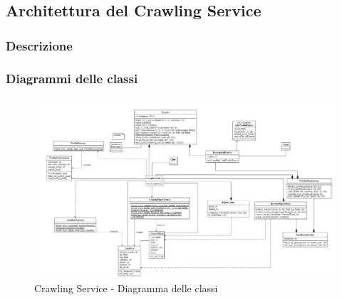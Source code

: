 \subsection{Architettura del Crawling Service}

\subsubsection{Descrizione}

\subsubsection{Diagrammi delle classi}
\begin{figure}[!h]
    \centering
    \includegraphics[scale=0.35]{Contenuto/Immagini/classi-CS.JPG}
    \caption{Crawling Service - Diagramma delle classi}
\end{figure}

